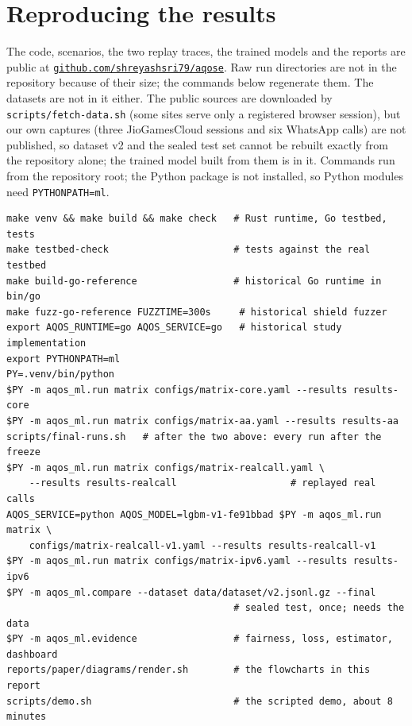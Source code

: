 \documentclass[11pt,a4paper]{article}
\newif\ifnewpage\newpagetrue
\newcommand{\samepagenext}{\global\newpagefalse}
\newcommand{\newpagenext}{\global\newpagetrue}
\begin{document}
\samepagenext
\appendix
\section{Reproducing the results}
\newpagenext
{\sloppy The code, scenarios, the two replay traces, the trained models and the reports are public at \href{https://github.com/shreyashsri79/aqose}{\texttt{github.com/shreyashsri79/aqose}}. Raw run directories are not in the repository because of their size; the commands below regenerate them. The datasets are not in it either. The public sources are downloaded by \texttt{scripts/fetch-data.sh} (some sites serve only a registered browser session), but our own captures (three JioGamesCloud sessions and six WhatsApp calls) are not published, so dataset v2 and the sealed test set cannot be rebuilt exactly from the repository alone; the trained model built from them is in it. Commands run from the repository root; the Python package is not installed, so Python modules need \texttt{PYTHONPATH=ml}.\par}
\begin{verbatim}
make venv && make build && make check   # Rust runtime, Go testbed, tests
make testbed-check                      # tests against the real testbed
make build-go-reference                 # historical Go runtime in bin/go
make fuzz-go-reference FUZZTIME=300s     # historical shield fuzzer
export AQOS_RUNTIME=go AQOS_SERVICE=go   # historical study implementation
export PYTHONPATH=ml
PY=.venv/bin/python
$PY -m aqos_ml.run matrix configs/matrix-core.yaml --results results-core
$PY -m aqos_ml.run matrix configs/matrix-aa.yaml --results results-aa
scripts/final-runs.sh   # after the two above: every run after the freeze
$PY -m aqos_ml.run matrix configs/matrix-realcall.yaml \
    --results results-realcall                    # replayed real calls
AQOS_SERVICE=python AQOS_MODEL=lgbm-v1-fe91bbad $PY -m aqos_ml.run matrix \
    configs/matrix-realcall-v1.yaml --results results-realcall-v1
$PY -m aqos_ml.run matrix configs/matrix-ipv6.yaml --results results-ipv6
$PY -m aqos_ml.compare --dataset data/dataset/v2.jsonl.gz --final
                                        # sealed test, once; needs the data
$PY -m aqos_ml.evidence                 # fairness, loss, estimator, dashboard
reports/paper/diagrams/render.sh        # the flowcharts in this report
scripts/demo.sh                         # the scripted demo, about 8 minutes
\end{verbatim}
\end{document}
